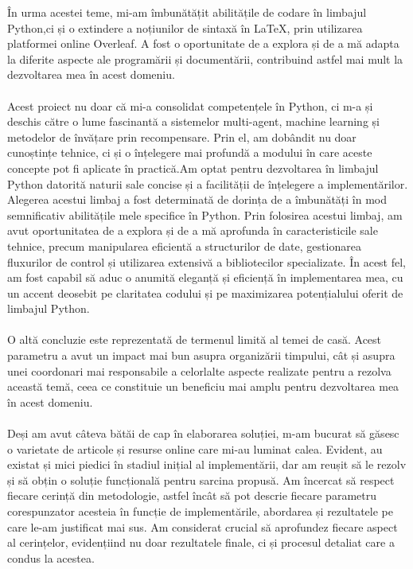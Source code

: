 \documentclass{article}
\begin{document}
 În urma acestei teme, mi-am îmbunătățit abilitățile de codare în limbajul Python,ci și o extindere a noțiunilor de sintaxă în LaTeX, prin utilizarea platformei online Overleaf. A fost o oportunitate de a explora și de a mă adapta la diferite aspecte ale programării și documentării, contribuind astfel mai mult la dezvoltarea mea în acest domeniu.\\\\
Acest proiect nu doar că mi-a consolidat competențele în Python, ci m-a și deschis către o lume fascinantă a sistemelor multi-agent, machine learning și metodelor de învățare prin recompensare. Prin el, am dobândit nu doar cunoștințe tehnice, ci și o înțelegere mai profundă a modului în care aceste concepte pot fi aplicate în practică.Am optat pentru dezvoltarea în limbajul Python datorită naturii sale concise și a facilității de înțelegere a implementărilor.\\
Alegerea acestui limbaj a fost determinată de dorința de a îmbunătăți în mod semnificativ abilitățile mele specifice în Python. Prin folosirea acestui limbaj, am avut oportunitatea de a explora și de a mă aprofunda în caracteristicile sale tehnice, precum manipularea eficientă a structurilor de date, gestionarea fluxurilor de control și utilizarea extensivă a bibliotecilor specializate. În acest fel, am fost capabil să aduc o anumită eleganță și eficiență în implementarea mea, cu un accent deosebit pe claritatea codului și pe maximizarea potențialului oferit de limbajul Python.\\\\
O altă concluzie este reprezentată de termenul limită al temei de casă. Acest parametru a avut un impact mai bun asupra organizării timpului, cât și asupra unei coordonari mai responsabile a celorlalte aspecte realizate pentru a rezolva această temă, ceea ce constituie un beneficiu mai amplu pentru dezvoltarea mea în acest domeniu.\\\\
Deși am avut câteva bătăi de cap în elaborarea soluției, m-am bucurat să găsesc o varietate de articole și resurse online care mi-au luminat calea. Evident, au existat și mici piedici în stadiul inițial al implementării, dar am reușit să le rezolv și să obțin o soluție funcțională pentru sarcina propusă.
Am încercat să respect fiecare cerință din metodologie, astfel încât să pot descrie fiecare parametru corespunzator acesteia în funcție de implementările, abordarea și rezultatele pe care le-am justificat mai sus. Am considerat crucial să aprofundez fiecare aspect al cerințelor, evidențiind nu doar rezultatele finale, ci și procesul detaliat care a condus la acestea.\\
\end{document}
